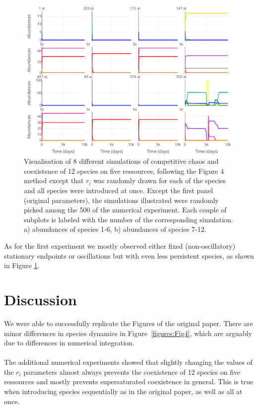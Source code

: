 \begin{figure}[H]
\begin{center} 
 \includegraphics[width=1\textwidth]{../Code/Figures/Figure_exp2.pdf}
  \caption{Visualisation of 8 different simulations of competitive chaos and coexistence of 12 species on five ressources, following the Figure 4 method except that $r_i$ was randomly drawn for each of the species and all species were introduced at once. Except the first panel (original parameters), the simulations illustrated were randomly picked among the 500 of the numerical experiment. Each couple of subplots is labeled with the number of the corresponding simulation. a) abundances of species 1-6, b) abundances of species 7-12.}
  \label{figures:Figexp2}
\end{center}
\end{figure}

As for the first experiment we mostly observed either fixed (non-oscillatory) stationary endpoints or oscillations but with even less persistent species, as shown in Figure \ref{figures:Figexp2}.

\section{Discussion}

We were able to successfully replicate the Figures of the original paper. There are minor differences in species dynamics in Figure~\ref{figures:Fig4}, which are arguably due to differences in numerical integration.\\~\\

The additional numerical experiments showed that slightly changing the values of the $r_i$ parameters almost always prevents the coexistence of 12 species on five ressources and mostly prevents
supersaturated coexistence in general. This is true when introducing species sequentially as in the original paper, as well as all at once. \\~\\

